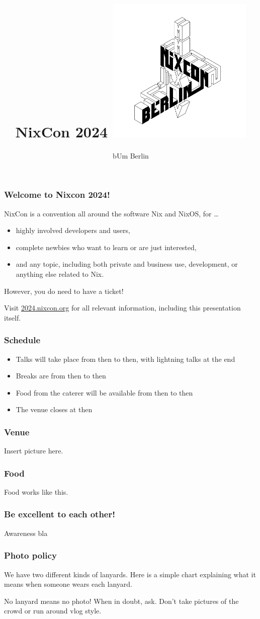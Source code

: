 \documentclass{beamer}
\title{NixCon 2024 \quad \includegraphics[height=7cm]{nixcon-2024-logo-inkscape3.png}}
\subtitle{bUm Berlin}
\date{\formatdate{25}{10}{2024}}
\begin{document}
\frame[plain]{\titlepage}

\begin{frame}
  \frametitle{Welcome to Nixcon 2024!}
  NixCon is a convention all around the software Nix and NixOS, for \dots
  \begin{itemize}
  \item highly involved developers and users,
  \item complete newbies who want to learn or are just interested,
  \item and any topic, including both private and business use, development, or anything else related to Nix.
  \end{itemize}
  
  However, you do need to have a ticket!

  Visit \href{https://2024.nixcon.org}{2024.nixcon.org} for all relevant information, including this presentation itself.
\end{frame}

\begin{frame}
  \frametitle{Schedule}

  \begin{itemize}
  \item Talks will take place from then to then, with lightning talks at the end
  \item Breaks are from then to then
  \item Food from the caterer will be available from then to then
  \item The venue closes at then
  \end{itemize}
\end{frame}

\begin{frame}
  \frametitle{Venue}
  Insert picture here.
\end{frame}

\begin{frame}
  \frametitle{Food}
  Food works like this.
\end{frame}

\begin{frame}
  \frametitle{Be excellent to each other!}
  Awareness bla
\end{frame}

\begin{frame}
  \frametitle{Photo policy}
  We have two different kinds of lanyards.  Here is a simple chart explaining what it means when someone wears each lanyard.

  No lanyard means no photo!  When in doubt, ask.  Don't take pictures of the crowd or run around vlog style.
\end{frame}
\end{document}
